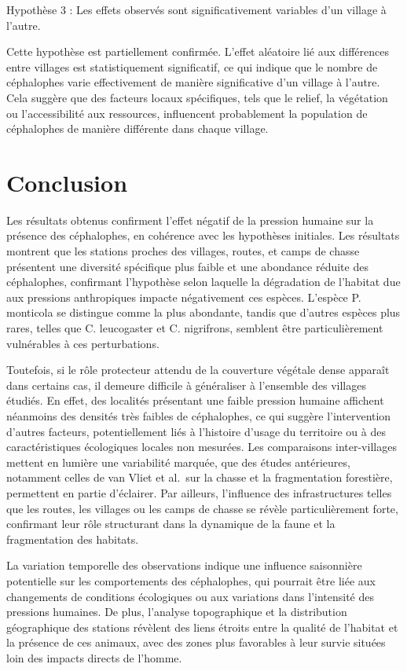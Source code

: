 \documentclass[
]{book}
\begin{document}
Hypothèse 3 : Les effets observés sont significativement variables d'un village à l'autre.

Cette hypothèse est partiellement confirmée. L'effet aléatoire lié aux différences entre villages est statistiquement significatif, ce qui indique que le nombre de céphalophes varie effectivement de manière significative d'un village à l'autre. Cela suggère que des facteurs locaux spécifiques, tels que le relief, la végétation ou l'accessibilité aux ressources, influencent probablement la population de céphalophes de manière différente dans chaque village.

\chapter{Conclusion}\label{conclusion}

Les résultats obtenus confirment l'effet négatif de la pression humaine sur la présence des céphalophes, en cohérence avec les hypothèses initiales. Les résultats montrent que les stations proches des villages, routes, et camps de chasse présentent une diversité spécifique plus faible et une abondance réduite des céphalophes, confirmant l'hypothèse selon laquelle la dégradation de l'habitat due aux pressions anthropiques impacte négativement ces espèces. L'espèce P. monticola se distingue comme la plus abondante, tandis que d'autres espèces plus rares, telles que C. leucogaster et C. nigrifrons, semblent être particulièrement vulnérables à ces perturbations.

Toutefois, si le rôle protecteur attendu de la couverture végétale dense apparaît dans certains cas, il demeure difficile à généraliser à l'ensemble des villages étudiés. En effet, des localités présentant une faible pression humaine affichent néanmoins des densités très faibles de céphalophes, ce qui suggère l'intervention d'autres facteurs, potentiellement liés à l'histoire d'usage du territoire ou à des caractéristiques écologiques locales non mesurées. Les comparaisons inter-villages mettent en lumière une variabilité marquée, que des études antérieures, notamment celles de van Vliet et al.~sur la chasse et la fragmentation forestière, permettent en partie d'éclairer. Par ailleurs, l'influence des infrastructures telles que les routes, les villages ou les camps de chasse se révèle particulièrement forte, confirmant leur rôle structurant dans la dynamique de la faune et la fragmentation des habitats.

La variation temporelle des observations indique une influence saisonnière potentielle sur les comportements des céphalophes, qui pourrait être liée aux changements de conditions écologiques ou aux variations dans l'intensité des pressions humaines. De plus, l'analyse topographique et la distribution géographique des stations révèlent des liens étroits entre la qualité de l'habitat et la présence de ces animaux, avec des zones plus favorables à leur survie situées loin des impacts directs de l'homme.
\end{document}
